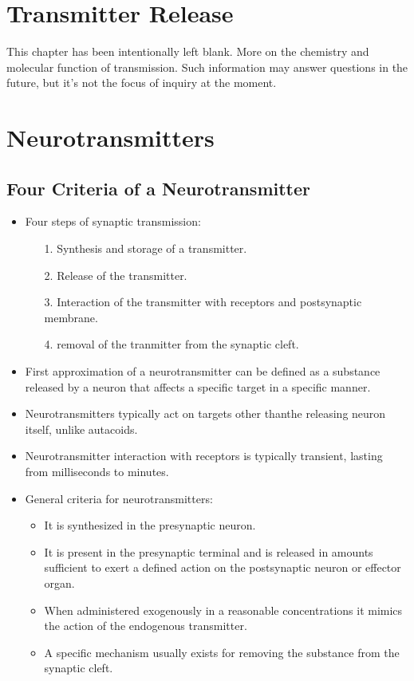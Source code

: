 \documentclass[12pt,a4paper]{article}
\begin{document}
\clearpage
\section{Transmitter Release}
    This chapter has been intentionally left blank. More on the chemistry and molecular function of transmission. Such information may answer questions in the future, but it's not the focus of inquiry at the moment. 

\clearpage
\section{Neurotransmitters}
\subsection{Four Criteria of a Neurotransmitter}   
\begin{itemize}
    \item Four steps of synaptic transmission: 
        \begin{itemize}
            \item[1.] Synthesis and storage of a transmitter.
            \item[2.] Release of the transmitter.
            \item[3.] Interaction of the transmitter with receptors and postsynaptic membrane.
            \item[4.] removal of the tranmitter from the synaptic cleft.
        \end{itemize}
    \item First approximation of a neurotransmitter can be defined as a substance released by a neuron that affects a specific target in a specific manner.
    \item Neurotransmitters typically act on targets other thanthe releasing neuron itself, unlike autacoids.
    \item Neurotransmitter interaction with receptors is typically transient, lasting from milliseconds to minutes.
    \item General criteria for neurotransmitters:
        \begin{itemize}
            \item It is synthesized in the presynaptic neuron.
            \item It is present in the presynaptic terminal and is released in amounts sufficient to exert a defined action on the postsynaptic neuron or effector organ.
            \item When administered exogenously in a reasonable concentrations it mimics the action of the endogenous transmitter.
            \item A specific mechanism usually exists for removing the substance from the synaptic cleft.
        \end{itemize}
\end{itemize}
\end{document}
